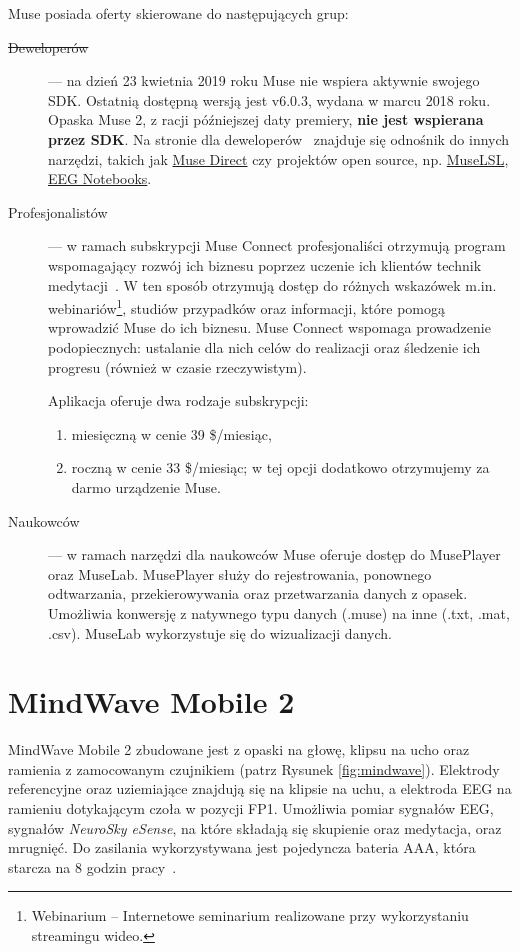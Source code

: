 \documentclass[skorowidz,skroty]{dyplomWEZUT}
\begin{document}
Muse posiada oferty skierowane do następujących grup:
\begin{description}
    \item [\sout{Deweloperów}] --- na dzień 23 kwietnia 2019 roku Muse nie wspiera aktywnie swojego SDK. Ostatnią dostępną wersją jest v6.0.3, wydana w marcu 2018 roku. Opaska Muse 2, z racji późniejszej daty premiery, \textbf{nie jest wspierana przez SDK}. Na stronie dla deweloperów~\cite{muse_developer} znajduje się odnośnik do innych narzędzi, takich jak \href{https://choosemuse.com/muse-direct/}{Muse Direct} czy projektów open source, np. \href{https://github.com/alexandrebarachant/muse-lsl}{MuseLSL}, \href{https://github.com/NeuroTechX/eeg-notebooks}{EEG Notebooks}.

    \item [Profesjonalistów] --- w ramach subskrypcji Muse Connect profesjonaliści otrzymują program wspomagający rozwój ich biznesu poprzez uczenie ich klientów technik medytacji~\cite{muse_professional}. W ten sposób otrzymują dostęp do różnych wskazówek m.in. webinariów\footnote{Webinarium -- Internetowe seminarium realizowane przy wykorzystaniu streamingu wideo.}, studiów przypadków oraz informacji, które pomogą wprowadzić Muse do ich biznesu. Muse Connect wspomaga prowadzenie podopiecznych: ustalanie dla nich celów do realizacji oraz śledzenie ich progresu (również w czasie rzeczywistym).

    Aplikacja oferuje dwa rodzaje subskrypcji:
    \begin{enumerate}
        \item miesięczną w cenie 39 \$/miesiąc,
        \item roczną w cenie 33 \$/miesiąc; w tej opcji dodatkowo otrzymujemy za darmo urządzenie Muse.
    \end{enumerate}

    \item [Naukowców] --- w ramach narzędzi dla naukowców Muse oferuje dostęp do MusePlayer oraz MuseLab. MusePlayer służy do rejestrowania, ponownego odtwarzania, przekierowywania oraz przetwarzania danych z opasek. Umożliwia konwersję z natywnego typu danych (.muse) na inne (.txt, .mat, .csv). MuseLab wykorzystuje się do wizualizacji danych.
\end{description}


\section{MindWave Mobile 2}
MindWave Mobile 2 zbudowane jest z opaski na głowę, klipsu na ucho oraz ramienia z zamocowanym czujnikiem (patrz Rysunek \vref{fig:mindwave}). Elektrody referencyjne oraz uziemiające znajdują się na klipsie na uchu, a elektroda EEG na ramieniu dotykającym czoła w pozycji FP1. Umożliwia pomiar sygnałów EEG, sygnałów \textit{NeuroSky eSense}, na które składają się skupienie oraz medytacja, oraz mrugnięć. Do zasilania wykorzystywana jest pojedyncza bateria AAA, która starcza na 8 godzin pracy~\cite{mindwave}.
\end{document}
